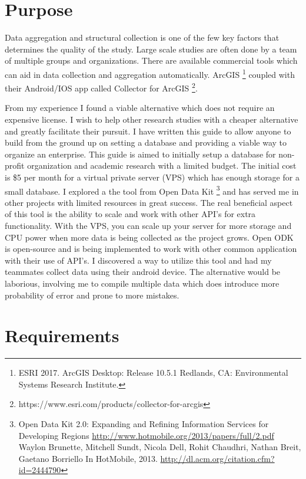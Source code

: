 \section*{Purpose}

\indent Data aggregation and structural collection is one of the few key factors that determines the quality of the study. Large scale studies are often done by a team of multiple groups and organizations. There are available commercial tools which can aid in data collection and aggregation automatically. ArcGIS \footnote{ESRI 2017. ArcGIS Desktop: Release 10.5.1 Redlands, CA: Environmental Systems Research Institute.} coupled with their Android/IOS app called Collector for ArcGIS \footnote{https://www.esri.com/products/collector-for-arcgis}.

From my experience I found a viable alternative which does not require an expensive license. I wish to help other research studies with a cheaper alternative and greatly facilitate their pursuit. I have written this guide to allow anyone to build from the ground up on setting a database and providing a viable way to organize an enterprise. This guide is aimed to initially setup a database for non-profit organization and academic research with a limited budget. The initial cost is \$5 per month for a virtual private server (VPS) which has enough storage for a small database. I explored a the tool from Open Data Kit \footnote{Open Data Kit 2.0: Expanding and Refining Information Services for Developing Regions \url{http://www.hotmobile.org/2013/papers/full/2.pdf} Waylon Brunette, Mitchell Sundt, Nicola Dell, Rohit Chaudhri, Nathan Breit, Gaetano Borriello In HotMobile, 2013. \url{http://dl.acm.org/citation.cfm?id=2444790}} and has served me in other projects with limited resources  in great success. The real beneficial aspect of this tool is the ability to scale and work with other API's for extra functionality. With the VPS, you can scale up your server for more storage and CPU power when more data is being collected as the project grows. Open ODK is open-source and is being implemented to work with other common application with their use of API's.  I discovered a way to utilize this tool and had my teammates collect data using their android device. The alternative would be laborious, involving me to compile multiple data which does introduce more probability of error and prone to more mistakes.



\section*{Requirements}

